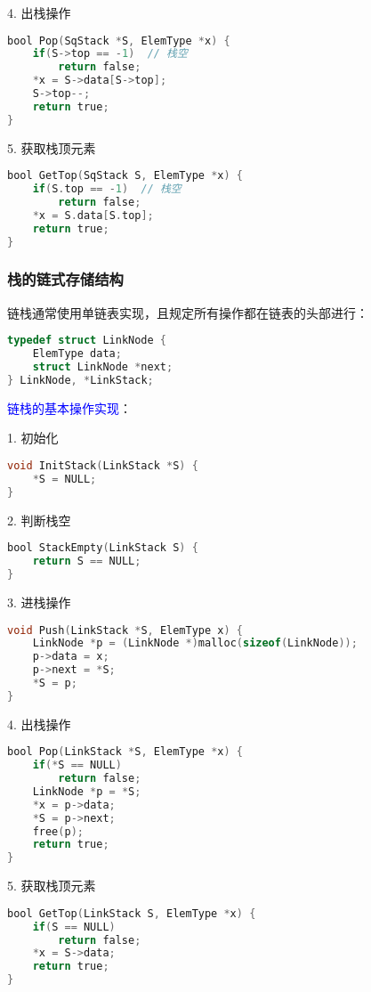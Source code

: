 \documentclass{../../note}
\begin{document}
4. 出栈操作
\begin{lstlisting}[language=C]
bool Pop(SqStack *S, ElemType *x) {
    if(S->top == -1)  // 栈空
        return false;
    *x = S->data[S->top];
    S->top--;
    return true;
}
\end{lstlisting}

5. 获取栈顶元素
\begin{lstlisting}[language=C]
bool GetTop(SqStack S, ElemType *x) {
    if(S.top == -1)  // 栈空
        return false;
    *x = S.data[S.top];
    return true;
}
\end{lstlisting}

\subsubsection{栈的链式存储结构}

链栈通常使用单链表实现，且规定所有操作都在链表的头部进行：

\begin{lstlisting}[language=C]
typedef struct LinkNode {
    ElemType data;
    struct LinkNode *next;
} LinkNode, *LinkStack;
\end{lstlisting}

\textcolor{blue}{链栈的基本操作实现}：

1. 初始化
\begin{lstlisting}[language=C]
void InitStack(LinkStack *S) {
    *S = NULL;
}
\end{lstlisting}

2. 判断栈空
\begin{lstlisting}[language=C]
bool StackEmpty(LinkStack S) {
    return S == NULL;
}
\end{lstlisting}

3. 进栈操作
\begin{lstlisting}[language=C]
void Push(LinkStack *S, ElemType x) {
    LinkNode *p = (LinkNode *)malloc(sizeof(LinkNode));
    p->data = x;
    p->next = *S;
    *S = p;
}
\end{lstlisting}

4. 出栈操作
\begin{lstlisting}[language=C]
bool Pop(LinkStack *S, ElemType *x) {
    if(*S == NULL)
        return false;
    LinkNode *p = *S;
    *x = p->data;
    *S = p->next;
    free(p);
    return true;
}
\end{lstlisting}

5. 获取栈顶元素
\begin{lstlisting}[language=C]
bool GetTop(LinkStack S, ElemType *x) {
    if(S == NULL)
        return false;
    *x = S->data;
    return true;
}
\end{lstlisting}
\end{document}

